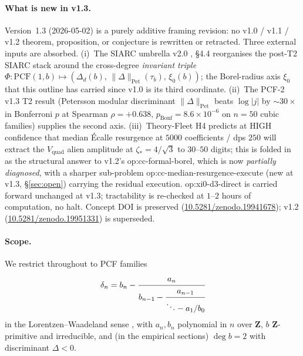 \documentclass[11pt,reqno]{amsart}
\theoremstyle{plain}
\theoremstyle{definition}
\theoremstyle{remark}
\newcommand{\PCF}{\mathrm{PCF}}
\newcommand{\dn}{\delta_{n}}
\begin{document}
\paragraph{What is new in v1.3.}
Version~1.3 (2026-05-02) is a purely additive framing
revision: no v1.0 / v1.1 / v1.2 theorem, proposition, or
conjecture is rewritten or retracted. Three external inputs
are absorbed. (i)~The SIARC umbrella v2.0
\cite{siarc_umbrella_v2}, \S4.4 reorganises the post-T2
SIARC stack around the cross-degree \emph{invariant triple}
$\Phi : \PCF(1,b) \mapsto
(\Delta_d(b),\,\|\Delta\|_{\mathrm{Pet}}(\tau_b),\,\xi_0(b))$;
the Borel-radius axis $\xi_0$ that this outline has carried
since v1.0 is its third coordinate. (ii)~The PCF-2 v1.3 T2
result \cite{siarc_pcf2_v13} (Petersson modular discriminant
$\|\Delta\|_{\mathrm{Pet}}$ beats $\log|j|$ by ${\sim}30\times$
in Bonferroni $p$ at Spearman $\rho = +0.638$,
$p_{\mathrm{Bonf}} = 8.6\times10^{-6}$ on $n=50$ cubic
families) supplies the second axis. (iii)~Theory-Fleet H4
\cite{siarc_theory_fleet_h4} predicts at HIGH confidence that
median \'Ecalle resurgence at $5000$ coefficients / dps $250$
will extract the $V_{\mathrm{quad}}$ alien amplitude at
$\zeta_* = 4/\sqrt 3$ to $30$--$50$ digits; this is folded in
as the structural answer to v1.2's
\textsf{op:cc-formal-borel}, which is now \emph{partially
diagnosed}, with a sharper sub-problem
\textsf{op:cc-median-resurgence-execute} (new at v1.3, \S\ref{sec:open})
carrying the residual execution. \textsf{op:xi0-d3-direct}
is carried forward unchanged at v1.3; tractability is
re-checked at $1$--$2$ hours of computation, no halt.
Concept DOI is preserved
(\href{https://doi.org/10.5281/zenodo.19941678}{10.5281/zenodo.19941678});
v1.2 (\href{https://doi.org/10.5281/zenodo.19951331}{10.5281/zenodo.19951331})
is superseded.

\paragraph{Scope.}
We restrict throughout to PCF families
\[
  \dn = b_n - \cfrac{a_n}{b_{n-1} - \cfrac{a_{n-1}}{\ddots - a_1/b_0}}
\]
in the Lorentzen--Waadeland sense \cite{lorentzen2008continued},
with $a_n, b_n$ polynomial in $n$ over $\mathbf{Z}$, $b$
$\mathbf{Z}$-primitive and irreducible, and (in the empirical
sections) $\deg b = 2$ with discriminant $\Delta < 0$.
\end{document}
